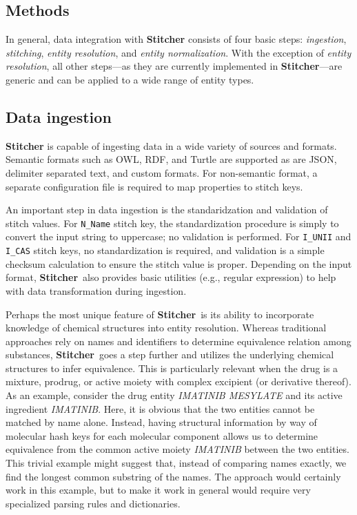 \documentclass{bioinfo}
\newcommand\st{\textbf{Stitcher}}
\begin{document}
\begin{methods}
\section{Methods}\label{sec:methods}
In general, data integration with \st{} consists of four basic steps: \emph{ingestion}, \emph{stitching}, \emph{entity resolution}, and \emph{entity normalization}. With the exception of \emph{entity resolution}, all other steps---as they are currently implemented in \st---are generic and can be applied to a wide range of entity types.

\subsection{Data ingestion}\label{sec:methods-ingest}
\st{} is capable of ingesting data in a wide variety of sources and formats. Semantic formats such as OWL, RDF, and Turtle are supported as are JSON, delimiter separated text, and custom formats. For non-semantic format, a separate configuration file is required to map properties to stitch keys.

An important step in data ingestion is the standaridzation and validation of stitch values. For \texttt{N\_Name} stitch key, the standardization procedure is simply to convert the input string to uppercase; no validation is performed. For \texttt{I\_UNII} and \texttt{I\_CAS} stitch keys, no standardization is required, and validation is a simple checksum calculation to ensure the stitch value is proper. Depending on the input format, \st\ also provides basic utilities (e.g., regular expression) to help with data transformation during ingestion.

Perhaps the most unique feature of \st\ is its ability to incorporate knowledge of chemical structures into entity resolution. Whereas traditional approaches rely on names and identifiers to determine equivalence relation among substances, \st\ goes a step further and utilizes the underlying chemical structures to infer equivalence. This is particularly relevant when the drug is a mixture, prodrug, or active moiety with complex excipient (or derivative thereof). As an example, consider the drug entity \emph{IMATINIB MESYLATE} and its active ingredient \emph{IMATINIB}. Here, it is obvious that the two entities cannot be matched by name alone. Instead, having structural information by way of molecular hash keys for each molecular component allows us to determine equivalence from the common active moiety \emph{IMATINIB} between the two entities. This trivial example might suggest that, instead of comparing names exactly, we find the longest common substring of the names. The approach would certainly work in this example, but to make it work in general would require very specialized parsing rules and dictionaries.


\end{methods}
\end{document}
